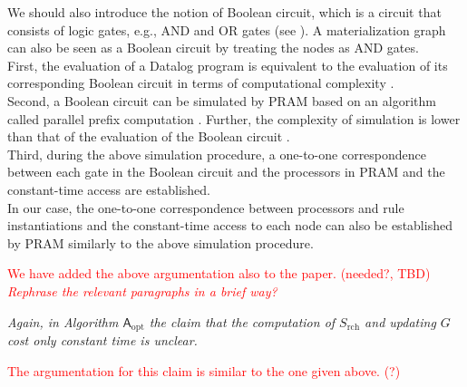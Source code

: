 \documentclass{article}
\let\quoteOld\quote
\let\endquoteOld\endquote
\renewenvironment{quote}{\quoteOld\itshape}{\endquoteOld}
\begin{document}
We should also introduce the notion of Boolean circuit, which is a
circuit that consists of logic gates, e.g., AND and OR gates (see
\cite[Section~2.3]{Raymond95}).  A materialization graph can also be
seen as a Boolean circuit by treating the nodes as AND gates.\\
%
First, the evaluation of a Datalog program is equivalent to the evaluation
of its corresponding Boolean circuit in terms of computational
complexity \cite{DMRT14a}. \\
%
Second, a Boolean circuit can be simulated by PRAM based on an
algorithm called parallel prefix computation \cite{LaFi80a}.  Further,
the complexity of simulation is lower than that of the evaluation of
the Boolean circuit \cite[Lemma~2.4.1]{Raymond95}.\\
%
Third, during the above simulation procedure, a one-to-one
correspondence between each gate in the Boolean circuit and the
processors in PRAM and the constant-time access are established.\\
%
In our case, the one-to-one correspondence between processors and rule
instantiations and the constant-time access to each node can also be
established by PRAM similarly to the above simulation procedure.

\textcolor{red}{We have added the above argumentation also to the
  paper. (needed?, TBD) \emph{Rephrase the relevant paragraphs in a brief way?}}

\begin{quote}
  Again, in Algorithm $\mathsf{A}_\text{opt}$ the claim that the
  computation of $S_\text{rch}$ and updating $G$ cost only constant
  time is unclear.
\end{quote}

\textcolor{red}{The argumentation for this claim is similar to the one
  given above. (?)}



\end{document}
